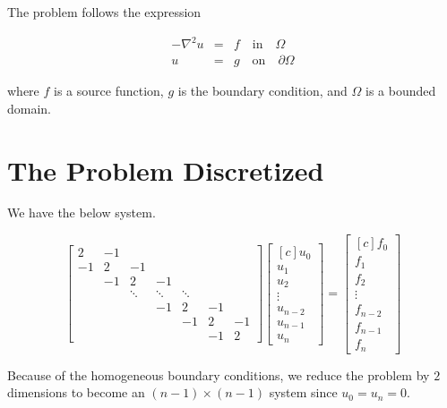 \documentclass[fontsize=11pt,paper=a4,titlepage]{article}
\begin{document}
The problem follows the expression

\begin{eqnarray}
	-\nabla^2 u & = & f \quad \textrm{in} \quad \Omega \\
	u & = & g \quad \textrm{on} \quad \partial\Omega
	\label{eq:Poisson}
\end{eqnarray}

where $f$ is a source function, $g$ is the boundary condition, and $\Omega$ is a
bounded domain.

\section{The Problem Discretized}
\label{sec:Prob-Discr}

We have the below system.

\begin{displaymath}
\begin{bmatrix}
	2 & -1 &  &  &  &  &  \\
	-1 & 2 & -1 &  &  &  &  \\
	 & -1 & 2 & -1 &  &  &  \\
	 &  & \ddots & \ddots & \ddots &  & \\
	 &  &  & -1 & 2 & -1 &  \\
	 &  &  &  & -1 & 2 & -1 \\
	 &  &  &  &  & -1 & 2
\end{bmatrix}
\begin{bmatrix*}[c]
	u_0 \\
	u_1 \\
	u_2 \\
	\vdots \\
	u_{n - 2} \\
	u_{n - 1} \\
	u_n
\end{bmatrix*}
=
\begin{bmatrix*}[c]
	f_0 \\
	f_1 \\
	f_2 \\
	\vdots \\
	f_{n - 2} \\
	f_{n - 1} \\
	f_n
\end{bmatrix*}
\end{displaymath}

Because of the homogeneous boundary conditions, we reduce the problem by $2$
dimensions to become an $(n - 1) \times (n - 1)$ system since $u_0 = u_n = 0$.
\end{document}
